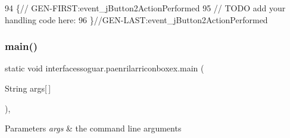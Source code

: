 \begin{DoxyCode}
94                                                                          \{\textcolor{comment}{//
      GEN-FIRST:event\_jButton2ActionPerformed}
95         \textcolor{comment}{// TODO add your handling code here:}
96     \}\textcolor{comment}{//GEN-LAST:event\_jButton2ActionPerformed}
\end{DoxyCode}
\mbox{\label{classinterfacessoguar_1_1paenrilarriconboxex_a84d168fb1b1d7a4607e63d360ac2def9}} 
\subsubsection{\texorpdfstring{main()}{main()}}
{\footnotesize\ttfamily static void interfacessoguar.\+paenrilarriconboxex.\+main (\begin{DoxyParamCaption}\item[{String}]{args\mbox{[}$\,$\mbox{]} }\end{DoxyParamCaption})\hspace{0.3cm}{\ttfamily [inline]}, {\ttfamily [static]}}


\begin{DoxyParams}{Parameters}
{\em args} & the command line arguments \\
\hline
\end{DoxyParams}

